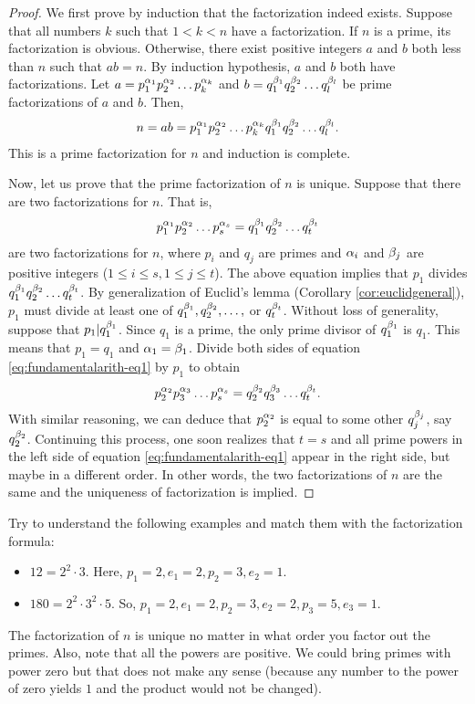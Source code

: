 \documentclass{subfile}
\begin{document}
	\begin{proof}
		We first prove by induction that the factorization indeed exists. Suppose that all numbers $k$ such that $1<k<n$ have a factorization. If $n$ is a prime, its factorization is obvious. Otherwise, there exist positive integers $a$ and $b$ both less than $n$ such that $ab=n$. By induction hypothesis, $a$ and $b$ both have factorizations. Let $a=p_1^{\alpha_1}p_2^{\alpha_2}\dots p_k^{\alpha_k}$ and $b=q_1^{\beta_1}q_2^{\beta_2}\dots q_l^{\beta_l}$ be prime factorizations of $a$ and $b$. Then,
		\begin{align*}
			n = ab = p_1^{\alpha_1}p_2^{\alpha_2}\dots p_k^{\alpha_k}q_1^{\beta_1}q_2^{\beta_2}\dots q_l^{\beta_l}.
		\end{align*}
		This is a prime factorization for $n$ and induction is complete.

		Now, let us prove that the prime factorization of $n$ is unique. Suppose that there are two factorizations for $n$. That is,
		\begin{align}
			p_1^{\alpha_1}p_2^{\alpha_2}\dots p_s^{\alpha_s}=q_1^{\beta_1}q_2^{\beta_2}\dots q_t^{\beta_t} \label{eq:fundamentalarith-eq1}
		\end{align}
		are two factorizations for $n$, where $p_i$ and $q_j$ are primes and $\alpha_i$ and $\beta_j$ are positive integers ($1 \leq i \leq s, 1 \leq j \leq t$). The above equation implies that $p_1$ divides $q_1^{\beta_1}q_2^{\beta_2}\dots q_t^{\beta_t}$. By generalization of Euclid's lemma (Corollary \eqref{cor:euclidgeneral}), $p_1$ must divide at least one of $q_1^{\beta_1},q_2^{\beta_2},\dots ,$ or $q_t^{\beta_t}$. Without loss of generality, suppose that $p_1|q_1^{\beta_1}$. Since $q_1$ is a prime, the only prime divisor of $q_1^{\beta_1}$ is $q_1$. This means that $p_1=q_1$ and $\alpha_1=\beta_1$. Divide both sides of equation \eqref{eq:fundamentalarith-eq1} by $p_1$ to obtain
		\begin{align*}
			p_2^{\alpha_2}p_3^{\alpha_3}\dots p_s^{\alpha_s}=q_2^{\beta_2}q_3^{\beta_3}\dots q_t^{\beta_t}.
		\end{align*}
		With similar reasoning, we can deduce that $p_2^{\alpha_2}$ is equal to some other $q_j^{\beta_j}$, say $q_2^{\beta_2}$. Continuing this process, one soon realizes that $t=s$ and all prime powers in the left side of equation \eqref{eq:fundamentalarith-eq1} appear in the right side, but maybe in a different order. In other words, the two factorizations of $n$ are the same and the uniqueness of factorization is implied.
	\end{proof}

	\begin{example}
		Try to understand the following examples and match them with the factorization formula:
		\begin{itemize}
			\item $12=2^2\cdot3$. Here, $p_1=2,e_1=2,p_2=3,e_2=1$.
			\item $180=2^2\cdot 3^2\cdot 5$. So,  $p_1=2,e_1=2,p_2=3,e_2=2,p_3=5,e_3=1$.
		\end{itemize}
		The factorization of $n$ is unique no matter in what order you factor out the primes. Also, note that all the powers are positive. We could bring primes with power zero but that does not make any sense (because any number to the power of zero yields $1$ and the product would not be changed).
	\end{example}
\end{document}
